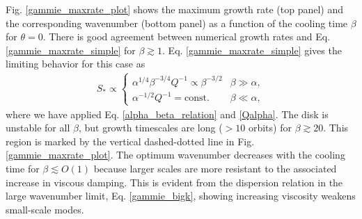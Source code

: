 Fig. \ref{gammie_maxrate_plot} shows the maximum
growth rate (top panel) and the corresponding wavenumber (bottom
panel) as a function of the cooling time $\beta$ for $\theta=0$.  
There is good agreement between numerical growth rates and
Eq. \ref{gammie_maxrate_simple} for $\beta \gtrsim 1$. 
Eq. \ref{gammie_maxrate_simple} gives the
limiting behavior for this case as   
\begin{align}
  S_*\propto \begin{cases}
    \alpha^{1/4}\beta^{-3/4}Q^{-1}\propto \beta^{-3/2} 
    &  \beta \gg \alpha, \\
    \alpha^{-1/2}Q^{-1} = \mathrm{const.} & \beta \ll \alpha, \label{high_visc}   
  \end{cases}
\end{align}
where we have applied Eq. \ref{alpha_beta_relation}
and \ref{Qalpha}. %
The disk is unstable for all $\beta$, but
growth timescales are long ($>10$ orbits) for $\beta \gtrsim
20$. %
This region is marked by the vertical dashed-dotted line in
Fig. \ref{gammie_maxrate_plot}. The optimum wavenumber decreases with
the cooling time for $\beta\lesssim O(1)$ because larger scales are 
more resistant to the associated increase in viscous damping. This is
evident from the dispersion relation in the large wavenumber limit,
Eq. \ref{gammie_bigk}, showing increasing viscosity weakens
small-scale modes. 


